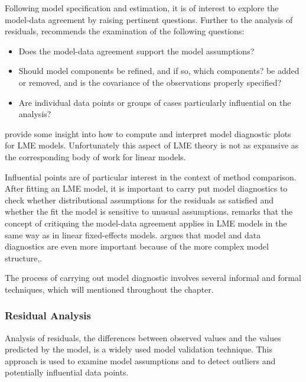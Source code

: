 \documentclass[12pt, a4paper]{report}
\theoremstyle{plain}
\theoremstyle{definition}
\theoremstyle{remark}
\begin{document}
Following model specification and estimation, it is of interest to explore the model-data agreement by raising pertinent questions.  Further to the analysis of residuals, \citet{schabenberger} recommends the examination of the following questions:
	\begin{itemize}
		\item Does the model-data agreement support the model assumptions?
		\item Should model components be refined, and if so, which components? %
		be added or removed, and is the covariance of the observations properly specified?
		\item Are individual data points or groups of cases particularly
		influential on the analysis?
	\end{itemize}
\citet{PB} provide some insight into how to compute and interpret model diagnostic plots for LME models. Unfortunately this aspect of LME theory is not as expansive as the corresponding body of work for linear models.

Influential points are of particular interest in the context of method comparison. After fitting an LME model, it is important to carry put model diagnostics to check whether distributional assumptions for the residuals as satisfied and whether the fit the model is sensitive to unusual assumptions. \citet{schabenberger} remarks that the concept of critiquing the model-data agreement applies in LME models in the same way as in linear fixed-effects models. \citep{west} argues that model and data diagnostics are even more important because of the more complex model structure,.

The process of carrying out model diagnostic involves several informal and formal techniques, which will mentioned throughout the chapter.




\subsubsection{Residual Analysis}
Analysis of residuals, the differences between observed values and the values predicted by the model, is a widely used model validation technique. This approach is used to examine model assumptions and to detect outliers and potentially influential data points. 
\end{document}

